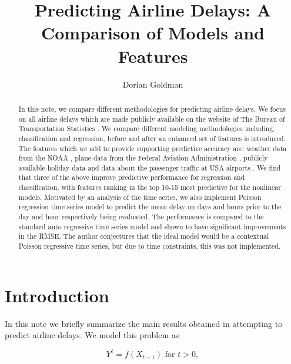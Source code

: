 \documentclass[twocolumn,showpacs,%
  nofootinbib,aps,superscriptaddress,%
  eqsecnum,prd,notitlepage,showkeys,10pt]{revtex4-1}
\begin{document}
\title{Predicting Airline Delays: A Comparison of Models and Features}
\author{Dorian Goldman}

\begin{abstract}
In this note, we compare different methodologies for predicting airline delays. We focus on all airline delays which are made publicly available on the website of
The Bureau of Transportation Statistics \cite{ontime}. We compare different modeling methodologies including, classification and regression, before and after an enhanced set of features
is introduced. The features which we add to provide supporting predictive accuracy are: weather data from the NOAA \cite{weather}, plane data from the Federal Aviation Administration \cite{aviation}, publicly available holiday data and data about the passenger traffic at USA airports \cite{boarding}. We find
that three of the above improve predictive performance for regression and classification, with features ranking in the top 10-15 most predictive for the nonlinear models. Motivated by an analysis of the time series, we also implement Poisson regression time series model to predict the mean delay on days and hours prior 
to the day and hour respectively being evaluated. The performance is compared to the standard auto regressive time series model and shown to have significant improvements in the RMSE. The author conjectures that the ideal model would be a contextual Poisson regressive time series, but due to time constraints, this was not implemented. 
\end{abstract}

\maketitle

\section{Introduction}

In this note we briefly summarize the main results obtained in attempting to predict airline delays. We model this problem as 

\begin{equation}
Y^t = f( X_{t-1}) \textrm{ for } t > 0,
\end{equation}
\end{document}
